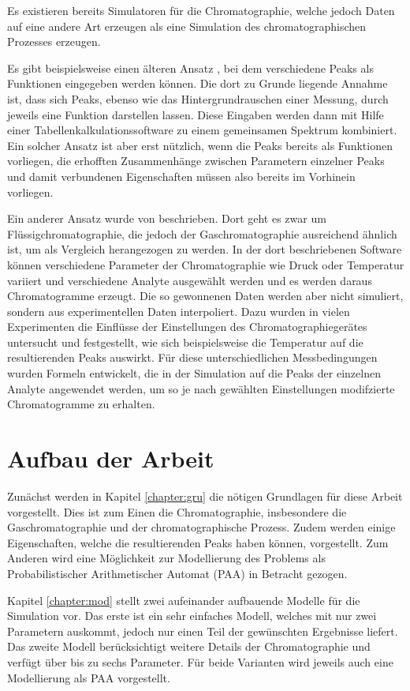 Es existieren bereits Simulatoren für die Chromatographie, welche jedoch Daten auf eine andere Art erzeugen als eine Simulation des chromatographischen Prozesses erzeugen.

Es gibt beispielsweise einen älteren Ansatz \citep{spreadsheet}, bei dem verschiedene Peaks als Funktionen eingegeben werden können. Die dort zu Grunde liegende Annahme ist, dass sich Peaks, ebenso wie das Hintergrundrauschen einer Messung, durch jeweils eine Funktion darstellen lassen. Diese Eingaben werden dann mit Hilfe einer Tabellenkalkulationssoftware zu einem gemeinsamen Spektrum kombiniert. Ein solcher Ansatz ist aber erst nützlich, wenn die Peaks bereits als Funktionen vorliegen, die erhofften Zusammenhänge zwischen Parametern einzelner Peaks und damit verbundenen Eigenschaften müssen also bereits im Vorhinein vorliegen.

Ein anderer Ansatz wurde von \citet{hplcsim} beschrieben. Dort geht es zwar um Flüssigchromatographie, die jedoch der Gaschromatographie ausreichend ähnlich ist, um als Vergleich herangezogen zu werden. In der dort beschriebenen Software können verschiedene Parameter der Chromatographie wie Druck oder Temperatur variiert und verschiedene Analyte ausgewählt werden und es werden daraus Chromatogramme erzeugt. Die so gewonnenen Daten werden aber nicht simuliert, sondern aus experimentellen Daten interpoliert. Dazu wurden in vielen Experimenten die Einflüsse der Einstellungen des Chromatographiegerätes untersucht und festgestellt, wie sich beispielsweise die Temperatur auf die resultierenden Peaks auswirkt. Für diese unterschiedlichen Messbedingungen wurden Formeln entwickelt, die in der Simulation auf die Peaks der einzelnen Analyte angewendet werden, um so je nach gewählten Einstellungen modifzierte Chromatogramme zu erhalten.


\section{Aufbau der Arbeit}
Zunächst werden in Kapitel \ref{chapter:gru} die nötigen Grundlagen für diese Arbeit vorgestellt. Dies ist zum Einen die Chromatographie, insbesondere die Gaschromatographie und der chromatographische Prozess. Zudem werden einige Eigenschaften, welche die resultierenden Peaks haben können, vorgestellt. Zum Anderen wird eine Möglichkeit zur Modellierung des Problems als Probabilistischer Arithmetischer Automat (PAA) in Betracht gezogen.

Kapitel \ref{chapter:mod} stellt zwei aufeinander aufbauende Modelle für die Simulation vor. Das erste ist ein sehr einfaches Modell, welches mit nur zwei Parametern auskommt, jedoch nur einen Teil der gewünschten Ergebnisse liefert. Das zweite Modell berücksichtigt weitere Details der Chromatographie und verfügt über bis zu sechs Parameter. Für beide Varianten wird jeweils auch eine Modellierung als PAA vorgestellt.

